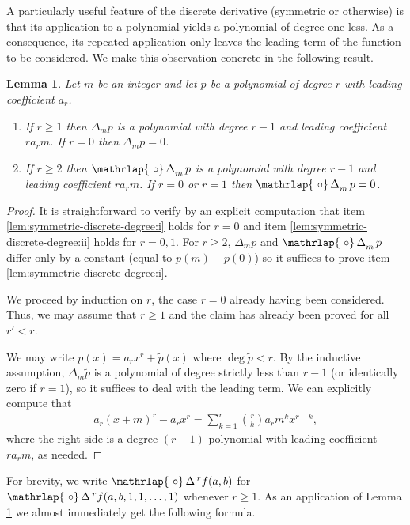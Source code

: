 \documentclass{amsart}
\newtheorem{lemma}[theorem]{Lemma}
\theoremstyle{definition}
\newcommand{\DeltaS}{\operatorname{\mathrlap{\ \circ}\operatorname{\Delta}}}
\begin{document}
A particularly useful feature of the discrete derivative (symmetric or otherwise) is that its application to a polynomial yields a polynomial of degree one less. As a consequence, its repeated application only leaves the leading term of the function to be considered. We make this observation concrete in the following result.

\begin{lemma}
\label{lem:symmetric-discrete-degree}
Let $m$ be an integer and let $p$ be a polynomial of degree $r$ with leading coefficient $a_r$. 
\begin{enumerate}
\item\label{lem:symmetric-discrete-degree:i} If $r \geq 1$ then $\Delta_m p$ is a polynomial with degree $r-1$ and leading coefficient $ra_rm$. If $r = 0$ then $\Delta_m p = 0$.
\item\label{lem:symmetric-discrete-degree:ii} If $r \geq 2$ then $\DeltaS_m p$ is a polynomial with degree $r-1$ and leading coefficient $ra_rm$. If $r = 0$ or $r = 1$ then $\DeltaS_m p = 0$.
\end{enumerate}
\end{lemma}
\begin{proof}
It is straightforward to verify by an explicit computation that item \ref{lem:symmetric-discrete-degree:i} holds for $r = 0$ and item \ref{lem:symmetric-discrete-degree:ii} holds for $r = 0,1$. For $r \geq 2$, $\Delta_m p$ and $\DeltaS_m p$ differ only by a constant (equal to $p(m)-p(0)$) so it suffices to prove item \ref{lem:symmetric-discrete-degree:i}.

We proceed by induction on $r$, the case $r = 0$ already having been considered. Thus, we may assume that $r \geq 1$ and the claim has already been proved for all $r' < r$. 

We may write $p(x) = a_r x^r + \tilde p(x)$ where $\deg \tilde p < r$. By the inductive assumption, $\Delta_m \tilde p$ is a polynomial of degree strictly less than $r-1$ (or identically zero if $r = 1$), so it suffices to deal with the leading term. We can explicitly compute that
\begin{align*}
	a_r(x+m)^r - a_r x^r = \sum_{k=1}^{r} \binom{r}{k} a_r m^k x^{r-k}, 
\end{align*}
where the right side is a degree-$(r-1)$ polynomial with leading coefficient $r a_r m$, as needed. 

\end{proof}

For brevity, we write $\DeltaS{}^r f(a,b)$ for $\DeltaS{}^r f(a,b, 1, 1, \dots, 1)$ whenever $r \geq 1$. As an application of Lemma \ref{lem:symmetric-discrete-degree} we almost immediately get the following formula.
\end{document}
